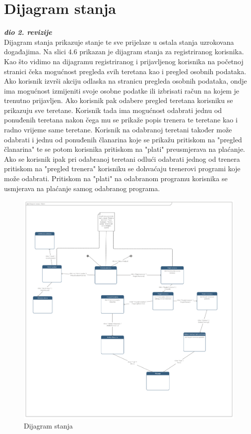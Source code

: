 		\eject
	
			\eject
		
		\section{Dijagram stanja}
			
			
			\textbf{\textit{dio 2. revizije}}\\
			
			Dijagram stanja prikazuje stanje te sve prijelaze u ostala stanja uzrokovana događajima. Na slici 4.6 prikazan je dijagram stanja za registriranog korisnika. Kao što vidimo na dijagramu registriranog i prijavljenog korisnika na početnoj stranici čeka mogućnost pregleda svih teretana kao i pregled osobnih podataka. Ako korisnik izvrši akciju odlaska na stranicu pregleda osobnih podataka, ondje ima mogućnost izmijeniti svoje osobne podatke ili izbrisati račun na kojem je trenutno prijavljen. Ako korisnik pak odabere pregled teretana korisniku se prikazuju sve teretane. Korisnik tada ima mogućnost odabrati jednu od ponuđenih teretana nakon čega mu se prikaže popis trenera te teretane kao i radno vrijeme same teretane. Korisnik na odabranoj teretani također može odabrati i jednu od ponuđenih članarina koje se prikažu pritiskom na "pregled članarina" te se potom korisnika pritiskom na "plati" preusmjerava na plaćanje. Ako se korisnik ipak pri odabranoj teretani odlući odabrati jednog od trenera pritiskom na "pregled trenera" korisniku se dohvaćaju trenerovi programi koje može odabrati. Pritiskom na "plati" na odabranom programu korisnika se usmjerava na plaćanje samog odabranog programa.
		\begin{figure}[H]
			\hspace*{-1.5cm}
			\includegraphics[scale=0.13]{dijagrami/dijagram_stanja.png} %
			\centering
			\caption{Dijagram stanja}
			\label{fig:promjene}
		\end{figure}
			

